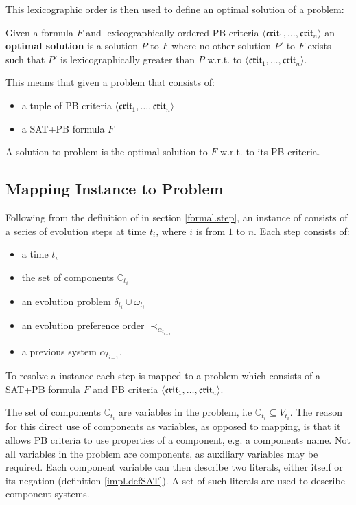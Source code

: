 This lexicographic order is then used to define an optimal solution of a \modelimpl problem:
\begin{defs}
Given a formula $F$ and lexicographically ordered PB criteria $\langle \mathfrak{crit}_1,\ldots,\mathfrak{crit}_n \rangle$
an \textbf{optimal solution} is a solution $P$ to $F$ 
where no other solution $P'$ to $F$ exists such that $P'$ is lexicographically greater than $P$ w.r.t. to $\langle \mathfrak{crit}_1,\ldots,\mathfrak{crit}_n \rangle$. 
\end{defs}

This means that given a \modelimpl problem that consists of:
\begin{itemize}
  \item a tuple of PB criteria $\langle \mathfrak{crit}_1,\ldots,\mathfrak{crit}_n \rangle$
  \item a SAT+PB formula $F$
\end{itemize}
A solution to \modelimpl problem is the optimal solution to $F$ w.r.t. to its PB criteria.

\subsection{Mapping \modelname Instance to \modelimpl Problem}
\label{impl.mapping}
Following from the definition of \modelname in section \ref{formal.step}, 
an instance of \modelname consists of a series of evolution steps at time $t_i$, where $i$ is from $1$ to $n$.
Each step consists of:
\begin{itemize}
  \item a time $t_i$
  \item the set of components $\mathbb{C}_{t_i}$ 
  \item an evolution problem $\delta_{t_i} \cup \omega_{t_i}$
  \item an evolution preference order $\prec_{\alpha_{t_{i-1}}}$
  \item a previous system $\alpha_{t_{i-1}}$.
\end{itemize}

To resolve a \modelname instance each step is mapped to a \modelimpl problem which consists of a SAT+PB formula $F$ 
and PB criteria $\langle \mathfrak{crit}_1,\ldots,\mathfrak{crit}_n \rangle$.

The set of components $\mathbb{C}_{t_i}$ are variables in the problem, i.e $\mathbb{C}_{t_i} \subseteq V_{t_i}$.
The reason for this direct use of components as variables, as opposed to mapping, is that it allows PB criteria to use properties of a component, e.g. a components name.
Not all variables in the problem are components, as auxiliary variables may be required.
Each component variable can then describe two literals, either itself or its negation (definition \ref{impl.defSAT}).
A set of such literals are used to describe component systems.

